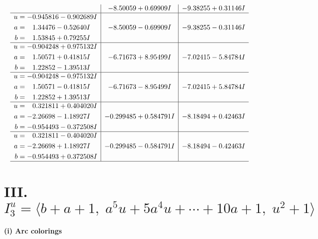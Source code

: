 \documentclass[1p]{elsarticle_modified}
\theoremstyle{definition}
\begin{document}
$$\begin{array}{c|c|c}
 & -8.50059 + 0.69909 I & -9.38255 + 0.31146 I \\ \hline\begin{aligned}
u &= -0.945816 - 0.902689 I \\
a &= \phantom{-}1.34476 - 0.52640 I \\
b &= \phantom{-}1.53845 + 0.79255 I\end{aligned}
 & -8.50059 - 0.69909 I & -9.38255 - 0.31146 I \\ \hline\begin{aligned}
u &= -0.904248 + 0.975132 I \\
a &= \phantom{-}1.50571 + 0.41815 I \\
b &= \phantom{-}1.22852 - 1.39513 I\end{aligned}
 & -6.71673 + 8.95499 I & -7.02415 - 5.84784 I \\ \hline\begin{aligned}
u &= -0.904248 - 0.975132 I \\
a &= \phantom{-}1.50571 - 0.41815 I \\
b &= \phantom{-}1.22852 + 1.39513 I\end{aligned}
 & -6.71673 - 8.95499 I & -7.02415 + 5.84784 I \\ \hline\begin{aligned}
u &= \phantom{-}0.321811 + 0.404020 I \\
a &= -2.26698 - 1.18927 I \\
b &= -0.954493 - 0.372508 I\end{aligned}
 & -0.299485 + 0.584791 I & -8.18494 + 0.42463 I \\ \hline\begin{aligned}
u &= \phantom{-}0.321811 - 0.404020 I \\
a &= -2.26698 + 1.18927 I \\
b &= -0.954493 + 0.372508 I\end{aligned}
 & -0.299485 - 0.584791 I & -8.18494 - 0.42463 I\\
 \hline 
 \end{array}$$\newpage\newpage\renewcommand{\arraystretch}{1}
\centering \section*{III. $I^u_{3}= \langle b+a+1,\;a^5 u+5 a^4 u+\cdots+10 a+1,\;u^2+1 \rangle$}
\flushleft \textbf{(i) Arc colorings}\\
\end{document}
